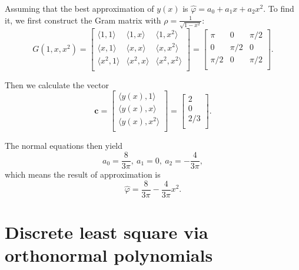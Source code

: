 \documentclass[a4paper]{article}
\begin{document}
Assuming that the best approximation of $y(x)$ is $\hat{\varphi} = a_0 + a_1 x + a_2 x^2$. To find it, we first construct the Gram matrix with $\rho = \frac{1}{\sqrt{1 - x^2}}$:
\begin{equation}
    G(1, x, x^2) = 
    \begin{bmatrix}
        \langle 1, 1 \rangle & \langle 1, x \rangle & \langle 1, x^2 \rangle \\
        \langle x, 1 \rangle & \langle x, x \rangle & \langle x, x^2 \rangle \\
        \langle x^2, 1 \rangle & \langle x^2, x \rangle & \langle x^2, x^2 \rangle \\
    \end{bmatrix}
    = \begin{bmatrix}
        \pi & 0 & \pi/2 \\
        0 & \pi/2 & 0 \\
        \pi/2 & 0 & \pi/2 \\
    \end{bmatrix}.
    \label{eq:3_gram_matrix}
\end{equation}

Then we calculate the vector 
\begin{equation}
    \mathbf{c} = \begin{bmatrix}
        \langle y(x), 1 \rangle \\
        \langle y(x), x \rangle \\
        \langle y(x), x^2 \rangle \\
    \end{bmatrix}
    = \begin{bmatrix}
        2 \\ 0 \\ 2/3 \\
    \end{bmatrix}.
    \label{eq:3_vector_c}
\end{equation}

The normal equations then yield 
\begin{equation}
    a_0 = \frac{8}{3\pi},\ a_1 = 0,\ a_2 = -\frac{4}{3\pi},
    \label{eq:3_normal_equations}
\end{equation}
which means the result of approximation is 
\begin{equation}
    \hat{\varphi} = \frac{8}{3\pi} - \frac{4}{3\pi}x^2.
    \label{eq:3_least_square_approximation}
\end{equation}

\section{Discrete least square via orthonormal polynomials}
\end{document}
